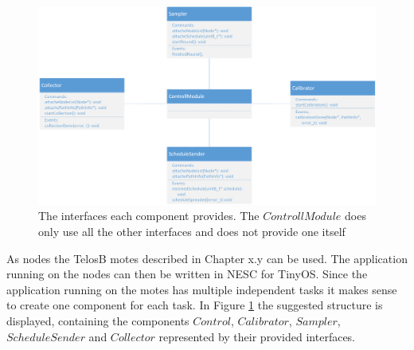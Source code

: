 \begin{figure}[htbp]
	\centering
    \includegraphics[scale=0.6]{content/images/Motes/GeneralStructure}
   	\caption{The interfaces each component provides. The $ControllModule$ does only use all the other interfaces and does not provide one itself}
    \label{fig:moteStructure}
\end{figure}

As nodes the TelosB motes described in Chapter x.y can be used. The application running on the nodes can then be written in NESC for TinyOS. Since the application running on the motes has multiple independent tasks it makes sense to create one component for each task. In Figure \ref{fig:moteStructure} the suggested structure is displayed, containing the components $Control$, $Calibrator$, $Sampler$, $ScheduleSender$ and $Collector$ represented by their provided interfaces. 

